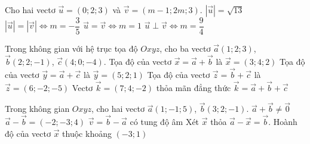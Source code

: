 \begin{ex}
	Cho hai vectơ $\vec{u}=(0;2;3)$ và $\vec{v}=(m-1;2m;3)$.
	\choiceTF
	{\True $|\vec{u}|=\sqrt{13}$}
	{$|\vec{u}|=|\vec{v}| \Leftrightarrow m=-\dfrac{3}{5}$}
	{\True $\vec{u}=\vec{v} \Leftrightarrow m=1$}
	{$\vec{u}\perp\vec{v} \Leftrightarrow m=\dfrac{9}{4}$}
\end{ex} 
\begin{ex}
	Trong không gian với hệ trục tọa độ $Oxyz$, cho ba vectơ $\vec{a}(1;2;3)$, $\vec{b}(2;2;-1)$, $\vec{c}(4;0;-4)$.
	\choiceTF
	{\True Tọa độ của vectơ $\vec{x}=\vec{a}+\vec{b}$ là $\vec{x}=(3;4;2)$}
	{Tọa độ của vectơ $\vec{y}=\vec{a}+\vec{c}$ là $\vec{y}=(5;2;1)$}
	{Tọa độ của vectơ $\vec{z}=\vec{b}+\vec{c}$ là $\vec{z}=(6;-2;-5)$}
	{\True Vectơ $\vec{k}=(7;4;-2)$ thỏa mãn đẳng thức $\vec{k}=\vec{a}+\vec{b}+\vec{c}$}
\end{ex}
\begin{ex}
	Trong không gian $Oxyz$, cho hai vectơ $\vec{a}(1;-1;5)$, $\vec{b}(3;2;-1)$.
	\choiceTF
	{\True $\vec{a}+\vec{b}\ne \vec{0}$}
	{$\vec{a}-\vec{b}=(-2;-3;4)$}
	{$\vec{v}=\vec{b}-\vec{a}$ có tung độ âm}
	{\True Xét $\vec{x}$ thỏa $\vec{a}-\vec{x}=\vec{b}$. Hoành độ của vectơ $\vec{x}$ thuộc khoảng $(-3;1)$}
\end{ex}

